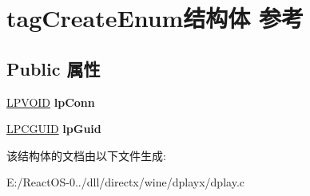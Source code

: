 \hypertarget{structtag_create_enum}{}\section{tag\+Create\+Enum结构体 参考}
\label{structtag_create_enum}
\subsection*{Public 属性}
\begin{DoxyCompactItemize}
\item 
\mbox{\label{structtag_create_enum_a6faa4b7ecd7fa63f6eac8f8f7c7bb021}} 
\hyperlink{interfacevoid}{L\+P\+V\+O\+ID} {\bfseries lp\+Conn}
\item 
\mbox{\label{structtag_create_enum_a6009541f296e06dc735dcdaa03e54074}} 
\hyperlink{interface_g_u_i_d}{L\+P\+C\+G\+U\+ID} {\bfseries lp\+Guid}
\end{DoxyCompactItemize}


该结构体的文档由以下文件生成\+:\begin{DoxyCompactItemize}
\item 
E\+:/\+React\+O\+S-\/0../dll/directx/wine/dplayx/dplay.\+c\end{DoxyCompactItemize}
